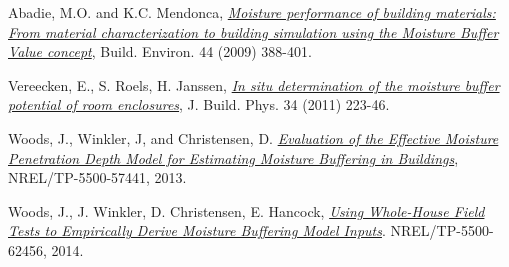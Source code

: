Abadie, M.O. and K.C. Mendonca,
\href{http://www.sciencedirect.com/science/article/pii/S0360132308000528}{\emph{Moisture
		performance of building materials: From material characterization to
		building simulation using the Moisture Buffer Value concept}}, Build.
Environ. 44 (2009) 388-401.

Vereecken, E., S. Roels, H. Janssen,
\href{http://jen.sagepub.com/content/34/3/223.abstract}{\emph{In situ
		determination of the moisture buffer potential of room enclosures}}, J.
Build. Phys. 34 (2011) 223-46.

Woods, J., Winkler, J, and Christensen, D.
\href{http://www.nrel.gov/docs/fy13osti/57441.pdf}{\emph{Evaluation of
		the Effective Moisture Penetration Depth Model for Estimating Moisture
		Buffering in Buildings}}, NREL/TP-5500-57441, 2013.

Woods, J., J. Winkler, D. Christensen, E. Hancock,
\href{http://www.nrel.gov/docs/fy14osti/62456.pdf}{\emph{Using
		Whole-House Field Tests to Empirically Derive Moisture Buffering Model
		Inputs}}. NREL/TP-5500-62456, 2014.

